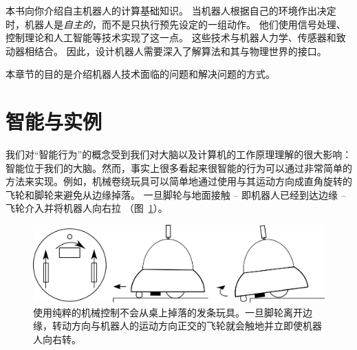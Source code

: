 本书向你介绍自主机器人的计算基础知识。 当机器人根据自己的环境作出决定时，机器人是\emph{自主的}，而不是只执行预先设定的一组动作。 他们使用信号处理、控制理论和人工智能等技术实现了这一点。 这些技术与机器人力学、传感器和致动器相结合。 因此，设计机器人需要深入了解算法和其与物理世界的接口。


本章节的目的是介绍机器人技术面临的问题和解决问题的方式。

\section{智能与实例}

我们对“智能行为”的概念受到我们对大脑以及计算机的工作原理理解的很大影响：智能位于我们的大脑。然而，事实上很多看起来很智能的行为可以通过非常简单的方法来实现。例如，机械卷绕玩具可以简单地通过使用与其运动方向成直角旋转的飞轮和脚轮来避免从边缘掉落。 一旦脚轮与地面接触 -- 即机器人已经到达边缘 -- 飞轮介入并将机器人向右拉 （图~\ref{fig:winduptoy}）。

\begin{figure}
	\centering
		\includegraphics[width=\textwidth]{figs/winduptoysketch.png}
	\caption{使用纯粹的机械控制不会从桌上掉落的发条玩具。一旦脚轮离开边缘，转动方向与机器人的运动方向正交的飞轮就会触地并立即使机器人向右转。}
	\label{fig:winduptoy}
\end{figure}

